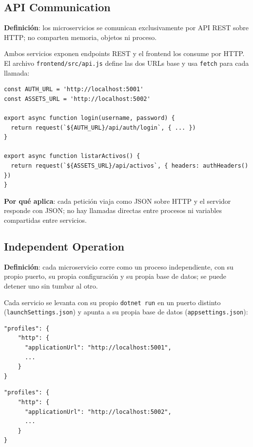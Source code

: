 \documentclass[11pt,a4paper]{article}
\begin{document}
\subsection{API Communication}

\textbf{Definición}: los microservicios se comunican exclusivamente por API
REST sobre HTTP; no comparten memoria, objetos ni proceso.

Ambos servicios exponen endpoints REST y el frontend los consume por HTTP. El
archivo \texttt{frontend/src/api.js} define las dos URLs base y usa
\texttt{fetch} para cada llamada:

\begin{lstlisting}[style=json, caption={frontend/src/api.js (fragmento)}]
const AUTH_URL = 'http://localhost:5001'
const ASSETS_URL = 'http://localhost:5002'

export async function login(username, password) {
  return request(`${AUTH_URL}/api/auth/login`, { ... })
}

export async function listarActivos() {
  return request(`${ASSETS_URL}/api/activos`, { headers: authHeaders() })
}
\end{lstlisting}

\textbf{Por qué aplica}: cada petición viaja como JSON sobre HTTP y el
servidor responde con JSON; no hay llamadas directas entre procesos ni
variables compartidas entre servicios.

\subsection{Independent Operation}

\textbf{Definición}: cada microservicio corre como un proceso independiente,
con su propio puerto, su propia configuración y su propia base de datos; se
puede detener uno sin tumbar al otro.

Cada servicio se levanta con su propio \texttt{dotnet run} en un puerto
distinto (\texttt{launchSettings.json}) y apunta a su propia base de datos
(\texttt{appsettings.json}):

\begin{lstlisting}[style=json, caption={AuthService.Api/Properties/launchSettings.json (fragmento)}]
"profiles": {
    "http": {
      "applicationUrl": "http://localhost:5001",
      ...
    }
}
\end{lstlisting}

\begin{lstlisting}[style=json, caption={AssetsService.Api/Properties/launchSettings.json (fragmento)}]
"profiles": {
    "http": {
      "applicationUrl": "http://localhost:5002",
      ...
    }
}
\end{lstlisting}
\end{document}
